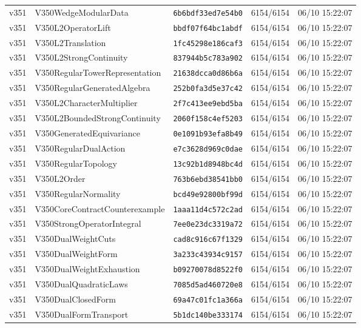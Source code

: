 \documentclass[11pt]{article}
\theoremstyle{definition}\newtheorem{deriv}{Derivação}
\begin{document}
{\begin{longtable}{@{}lllll@{}}
v351 & V350WedgeModularData & \texttt{6b6bdf33ed7e54b0} & 6154/6154 & 06/10 15:22:07 \\
v351 & V350L2OperatorLift & \texttt{bbdf07f64bc1abdf} & 6154/6154 & 06/10 15:22:07 \\
v351 & V350L2Translation & \texttt{1fc45298e186caf3} & 6154/6154 & 06/10 15:22:07 \\
v351 & V350L2StrongContinuity & \texttt{837944b5c783a902} & 6154/6154 & 06/10 15:22:07 \\
v351 & V350RegularTowerRepresentation & \texttt{21638dcca0d86b6a} & 6154/6154 & 06/10 15:22:07 \\
v351 & V350RegularGeneratedAlgebra & \texttt{252b0fa3d5e37c42} & 6154/6154 & 06/10 15:22:07 \\
v351 & V350L2CharacterMultiplier & \texttt{2f7c413ee9ebd5ba} & 6154/6154 & 06/10 15:22:07 \\
v351 & V350L2BoundedStrongContinuity & \texttt{2060f158c4ef5203} & 6154/6154 & 06/10 15:22:07 \\
v351 & V350GeneratedEquivariance & \texttt{0e1091b93efa8b49} & 6154/6154 & 06/10 15:22:07 \\
v351 & V350RegularDualAction & \texttt{e7c3628d969c0dae} & 6154/6154 & 06/10 15:22:07 \\
v351 & V350RegularTopology & \texttt{13c92b1d8948bc4d} & 6154/6154 & 06/10 15:22:07 \\
v351 & V350L2Order & \texttt{763b6ebd38541bb0} & 6154/6154 & 06/10 15:22:07 \\
v351 & V350RegularNormality & \texttt{bcd49e92800bf99d} & 6154/6154 & 06/10 15:22:07 \\
v351 & V350CoreContractCounterexample & \texttt{1aaa11d4c572c2ad} & 6154/6154 & 06/10 15:22:07 \\
v351 & V350StrongOperatorIntegral & \texttt{7ee0e23dc3319a72} & 6154/6154 & 06/10 15:22:07 \\
v351 & V350DualWeightCuts & \texttt{cad8c916c67f1329} & 6154/6154 & 06/10 15:22:07 \\
v351 & V350DualWeightForm & \texttt{3a233c43934c9157} & 6154/6154 & 06/10 15:22:07 \\
v351 & V350DualWeightExhaustion & \texttt{b09270078d8522f0} & 6154/6154 & 06/10 15:22:07 \\
v351 & V350DualQuadraticLaws & \texttt{7085d5ad460720e8} & 6154/6154 & 06/10 15:22:07 \\
v351 & V350DualClosedForm & \texttt{69a47c01fc1a366a} & 6154/6154 & 06/10 15:22:07 \\
v351 & V350DualFormTransport & \texttt{5b1dc140be333174} & 6154/6154 & 06/10 15:22:07 \\

\end{longtable}}
\end{document}
